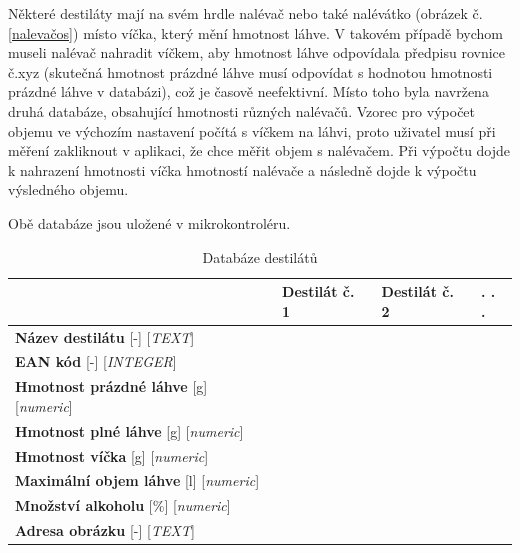 
Některé destiláty mají na svém hrdle nalévač nebo také nalévátko (obrázek č. \ref{nalevačos}) místo víčka, který mění hmotnost láhve. V takovém případě bychom museli nalévač nahradit víčkem, aby hmotnost láhve odpovídala předpisu rovnice č.xyz (skutečná hmotnost prázdné láhve musí odpovídat s hodnotou hmotnosti prázdné láhve v databázi), což je časově neefektivní. Místo toho byla navržena druhá databáze, obsahující hmotnosti různých nalévačů. Vzorec pro výpočet objemu ve výchozím nastavení počítá s víčkem na láhvi, proto uživatel musí při měření zakliknout v aplikaci, že chce měřit objem s nalévačem. Při výpočtu dojde k nahrazení hmotnosti víčka hmotností nalévače a následně dojde k výpočtu výsledného objemu.



Obě databáze jsou uložené v mikrokontroléru.

\begin{table}[H]
\centering
\begin{tabular}{|l|l|l|l|}
\hline
 & Destilát č. 1   & Destilát č. 2   &  . . . \\ \hline
\textbf{Název destilátu} [-] [\textit{TEXT}] &   &    &  \\ \hline
\textbf{EAN kód} [-] [\textit{INTEGER}]&  &    &        \\ \hline
\textbf{Hmotnost prázdné láhve} [g] [\textit{numeric}] &    &  &        \\ \hline
\textbf{Hmotnost plné láhve} [g] [\textit{numeric}] &    &    &  \\ \hline
\textbf{Hmotnost víčka} [g] [\textit{numeric}] &    &    &  \\ \hline
\textbf{Maximální objem láhve} [l] [\textit{numeric}] &    &    &  \\ \hline
\textbf{Množství alkoholu} [\%] [\textit{numeric}] &    &    &  \\ \hline
\textbf{Adresa obrázku} [-] [\textit{TEXT}] &    &    &  \\ \hline
\end{tabular}
\label{databaze_destilatu}
\caption{Databáze destilátů}
\end{table}


